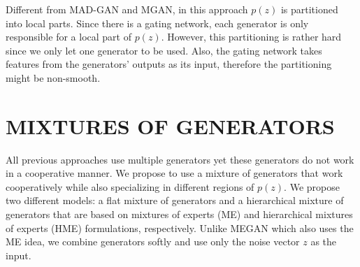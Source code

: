 \documentclass[a4paper,onesided,12pt]{report}
\begin{document}
Different from MAD-GAN and MGAN, in this approach $p(z)$ is partitioned into local parts. Since there is a gating network, each generator is only responsible for a local part of $p(z)$. However, this partitioning is rather hard since we only let one generator to be used. Also, the gating network takes features from the generators' outputs as its input, therefore the partitioning might be non-smooth.

%
\chapter{MIXTURES OF GENERATORS}
\label{chapter:mixture_gan}
All previous approaches use multiple generators yet these generators do not work in a cooperative manner. We propose to use a mixture of generators that work cooperatively while also specializing in different regions of $p(z)$. We propose two different models: a flat mixture of generators and a hierarchical mixture of generators that are based on mixtures of experts (ME) \cite{jacobs1991adaptive} and hierarchical mixtures of experts (HME) \cite{jordan1994hierarchical} formulations, respectively. Unlike MEGAN which also uses the ME idea, we combine generators softly and use only the noise vector $z$ as the input.
\end{document}
